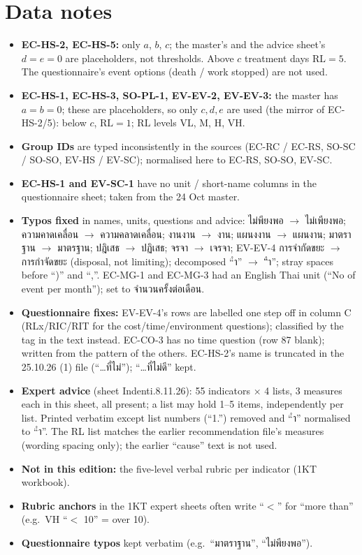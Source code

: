 \documentclass[10pt,a4paper]{article}
\newcommand{\RL}{\mathrm{RL}}\newcommand{\RIC}{\mathrm{RI_C}}\newcommand{\RIT}{\mathrm{RI_T}}\newcommand{\RIE}{\mathrm{RI_E}}
\begin{document}
\section{Data notes}
\begin{itemize}[leftmargin=1.2em]
\item \textbf{EC-HS-2, EC-HS-5:} only $a$, $b$, $c$; the master's and the advice sheet's $d=e=0$ are placeholders, not thresholds. Above $c$ treatment days $\RL=5$. The questionnaire's event options (death / work stopped) are not used.
\item \textbf{EC-HS-1, EC-HS-3, SO-PL-1, EV-EV-2, EV-EV-3:} the master has $a=b=0$; these are placeholders, so only $c,d,e$ are used (the mirror of EC-HS-2/5): below $c$, $\RL=1$; $\RL$ levels VL, M, H, VH.
\item \textbf{Group IDs} are typed inconsistently in the sources (EC-RC / EC-RS, SO-SC / SO-SO, EV-HS / EV-SC); normalised here to EC-RS, SO-SO, EV-SC.
\item \textbf{EC-HS-1 and EV-SC-1} have no unit / short-name columns in the questionnaire sheet; taken from the 24 Oct master.
\item \textbf{Typos fixed} in names, units, questions and advice: ไม่พียงพอ $\to$ ไม่เพียงพอ; ความคาดเคลื่อน $\to$ ความคลาดเคลื่อน; งานงาน $\to$ งาน; แผนงงาน $\to$ แผนงาน; มาตราฐาน $\to$ มาตรฐาน; ปฎิเสธ $\to$ ปฏิเสธ; จรจา $\to$ เจรจา; EV-EV-4 การจำกัดขยะ $\to$ การกำจัดขยะ (disposal, not limiting); decomposed ``ํา'' $\to$ ``ำ''; stray spaces before ``)'' and ``,''. EC-MG-1 and EC-MG-3 had an English Thai unit (``No of event per month''); set to จำนวนครั้งต่อเดือน.
\item \textbf{Questionnaire fixes:} EV-EV-4's rows are labelled one step off in column C (RLx/RIC/RIT for the cost/time/environment questions); classified by the tag in the text instead. EC-CO-3 has no time question (row 87 blank); written from the pattern of the others. EC-HS-2's name is truncated in the 25.10.26 (1) file (``…ที่ไม่''); ``…ที่ไม่ดี'' kept.\item \textbf{Expert advice} (sheet Indenti.8.11.26): 55 indicators × 4 lists, 3 measures each in this sheet, all present; a list may hold 1--5 items, independently per list. Printed verbatim except list numbers (``1.'') removed and ``ํา'' normalised to ``ำ''. The RL list matches the earlier recommendation file's measures (wording spacing only); the earlier ``cause'' text is not used. \item \textbf{Not in this edition:} the five-level verbal rubric per indicator (1KT workbook).\item \textbf{Rubric anchors} in the 1KT expert sheets often write ``$<$'' for ``more than'' (e.g.\ VH ``$<$ 10'' = over 10).
\item \textbf{Questionnaire typos} kept verbatim (e.g.\ ``มาตราฐาน'', ``ไม่พียงพอ'').
\end{itemize}
\end{document}
